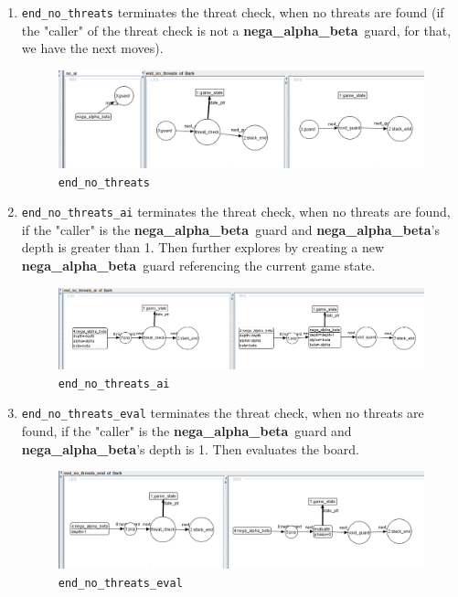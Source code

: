 \documentclass[a4paper, 10pt]{scrartcl}
\newcommand{\noderepr}[1]{\textsf{\textbf{#1}}}
\newcommand{\ai}{\noderepr{nega\_alpha\_beta}}
\begin{document}
\begin{enumerate}
        \item \texttt{end\_no\_threats} terminates the threat check, when no threats are found (if the "caller" of the threat check is not a \ai\ guard, for that, we have the next moves).
        \begin{figure}[H]
            \centering
            \includegraphics[width=.8\linewidth]{images/end_no_threats.png}
            \caption{\texttt{end\_no\_threats}}
        \end{figure}
        \item \texttt{end\_no\_threats\_ai} terminates the threat check, when no threats are found, if the "caller" is the \ai\ guard and \ai's depth is greater than 1. Then further explores by creating a new \ai\ guard referencing the current game state.
        \begin{figure}[H]
            \centering
            \includegraphics[width=.8\linewidth]{images/end_no_threats_ai.png}
            \caption{\texttt{end\_no\_threats\_ai}}
        \end{figure}
        \item \texttt{end\_no\_threats\_eval} terminates the threat check, when no threats are found, if the "caller" is the \ai\ guard and \ai's depth is 1. Then evaluates the board.
        \begin{figure}[H]
            \centering
            \includegraphics[width=.8\linewidth]{images/end_no_threats_eval.png}
            \caption{\texttt{end\_no\_threats\_eval}}
        \end{figure}
    \end{enumerate}
\end{document}
